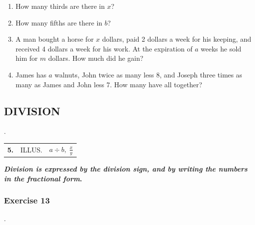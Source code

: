\documentclass{book}
\begin{document}
\begin{enumerate}
\item How many thirds are there in $x$?

\item How many fifths are there in $b$?

\item A man bought a horse for $x$ dollars, paid 2 dollars a week
for his keeping, and received 4 dollars a week for his work. At
the expiration of $a$ weeks he sold him for $m$ dollars. How much
did he gain?

\item James has $a$ walnuts, John twice as many less 8, and Joseph
three times as many as James and John less 7. How many have all
together?
\end{enumerate}


\subsection*{DIVISION}.

\begin{tabular}{cll}
\textbf{5.} & ILLUS. & $a \div b,\; \frac{\displaystyle x}{\displaystyle y}$\\
\end{tabular}

\textbf{ \textit{Division is expressed by the division sign, and
by writing the numbers in the fractional form}.}

\subsubsection*{Exercise 13}.
\end{document}
